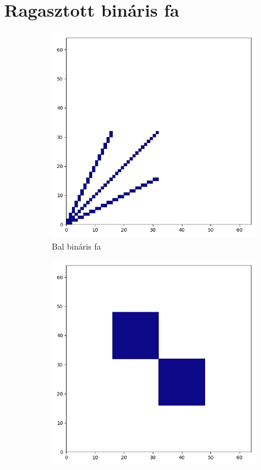 \section{Ragasztott bináris fa}

\begin{figure}[H]
  \centering
  \begin{subfigure}{.3\linewidth}
    \centering
    \includegraphics[width=\linewidth]{./figures/ragasztott_binaris/subgraph_00.jpg}
    \caption{Bal bináris fa}
  \end{subfigure}
  \begin{subfigure}{.3\linewidth}
    \centering
    \includegraphics[width=\linewidth]{./figures/ragasztott_binaris/subgraph_02.jpg}

\end{subfigure}
\end{figure}
